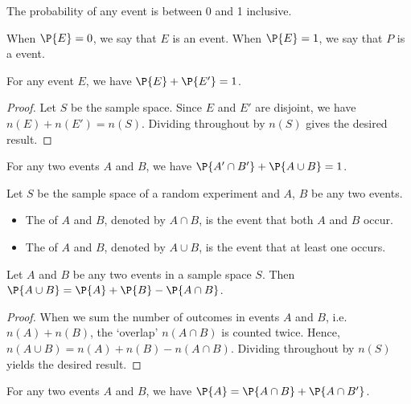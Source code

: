 \begin{corollary}
    The probability of any event is between 0 and 1 inclusive.
\end{corollary}

\begin{definition}
    When $\P{E} = 0$, we say that $E$ is an  event. When $\P{E} = 1$, we say that $P$ is a  event.
\end{definition}

\begin{proposition}
    For any event $E$, we have $\P{E} + \P{E'} = 1$.
\end{proposition}
\begin{proof}
    Let $S$ be the sample space. Since $E$ and $E'$ are disjoint, we have $n(E) + n(E') = n(S)$. Dividing throughout by $n(S)$ gives the desired result.
\end{proof}

\begin{corollary}
    For any two events $A$ and $B$, we have $\P{A' \cap B'} + \P{A \cup B} = 1$.
\end{corollary}

\begin{definition}
    Let $S$ be the sample space of a random experiment and $A$, $B$ be any two events.
    \begin{itemize}
        \item The  of $A$ and $B$, denoted by $A \cap B$, is the event that both $A$ and $B$ occur.
        \item The  of $A$ and $B$, denoted by $A \cup B$, is the event that at least one occurs.
    \end{itemize}
\end{definition}

\begin{proposition}
    Let $A$ and $B$ be any two events in a sample space $S$. Then $\P{A \cup B} = \P{A} + \P{B} - \P{A \cap B}$.
\end{proposition}
\begin{proof}
    When we sum the number of outcomes in events $A$ and $B$, i.e. $n(A) + n(B)$, the `overlap' $n(A \cap B)$ is counted twice. Hence, $n(A \cup B) = n(A) + n(B) - n(A \cap B)$. Dividing throughout by $n(S)$ yields the desired result.
\end{proof}

\begin{corollary}
    For any two events $A$ and $B$, we have $\P{A} = \P{A \cap B} + \P{A \cap B'}$.
\end{corollary}

